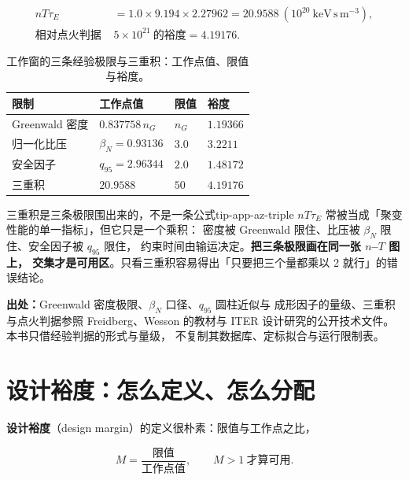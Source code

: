 \begin{equation}
\begin{aligned}
n T \tau_E&=1.0\times9.194\times2.27962=20.9588\ (10^{20}\ \mathrm{keV\,s\,m^{-3}}),\\
\text{相对点火判据 }&5\times10^{21}\ \text{的裕度}=4.19176 .
\end{aligned}
\label{eq:app-az-triple}
\end{equation}

\begin{table}[htbp]
\centering
\small
\setlength{\tabcolsep}{4pt}
\caption{工作窗的三条经验极限与三重积：工作点值、限值与裕度。}
\label{tab:app-az-window}
\begin{tabular}{p{4.4cm}p{2.6cm}p{2.4cm}p{2.6cm}}
\toprule
限制 & 工作点值 & 限值 & 裕度 \\
\midrule
Greenwald 密度 & $0.837758\,n_G$ & $n_G$ & $1.19366$ \\
归一化比压 & $\beta_N=0.93136$ & $3.0$ & $3.2211$ \\
安全因子 & $q_{95}=2.96344$ & $2.0$ & $1.48172$ \\
三重积 & $20.9588$ & $50$ & $4.19176$ \\
\bottomrule
\end{tabular}

\end{table}

\begin{tip}{三重积是三条极限围出来的，不是一条公式}{tip-app-az-triple}
$nT\tau_E$ 常被当成「聚变性能的单一指标」，但它只是一个乘积：
密度被 Greenwald 限住、比压被 $\beta_N$ 限住、安全因子被 $q_{95}$ 限住，
约束时间由输运决定。\textbf{把三条极限画在同一张 $n$--$T$ 图上，
交集才是可用区}。只看三重积容易得出「只要把三个量都乘以 2 就行」的错误结论。
\end{tip}

{\footnotesize
\textbf{出处：}Greenwald 密度极限、$\beta_N$ 口径、$q_{95}$ 圆柱近似与
成形因子的量级、三重积与点火判据参照 Freidberg、Wesson 的教材与
ITER 设计研究的公开技术文件。
本书只借经验判据的形式与量级，
不复制其数据库、定标拟合与运行限制表。
}

\section{设计裕度：怎么定义、怎么分配}
\label{sec:app-az-margin}

\textbf{设计裕度}（design margin）的定义很朴素：限值与工作点之比，

\begin{equation}
M=\frac{\text{限值}}{\text{工作点值}},
\qquad
M>1\ \text{才算可用}.
\label{eq:app-az-margin}
\end{equation}


